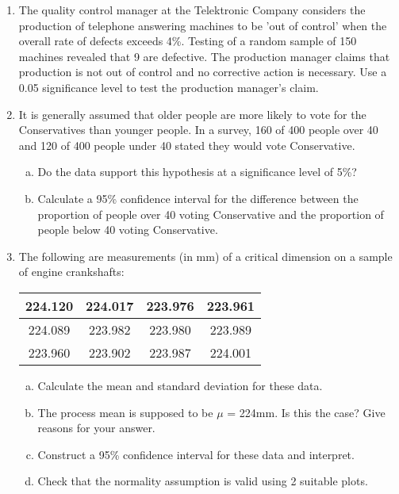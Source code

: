 \documentclass[a4paper,12pt]{article}
\begin{document}
\begin{enumerate}
\item  
The quality control manager at the Telektronic Company considers the production of telephone answering machines to be ’out of control’ when the overall rate of defects exceeds 4\%. 
Testing of a random sample of 150 machines revealed that 9 are defective. The production manager claims that production is not out of control and no corrective action is necessary. Use a 0.05 significance level to test the production manager’s claim.

\item 
It is generally assumed that older people are more likely to vote for the Conservatives than younger people. In a survey, 160 of 400 people over 40 and 120 of 400 people under 40 stated they would vote Conservative. 
\begin{enumerate}[(a)]
\item Do the data support this hypothesis at a significance level of 5\%?
\item Calculate a 95\% confidence interval for the difference between the proportion of people over 40 voting Conservative and the proportion of people below 40 voting Conservative. 
\end{enumerate}
\item The following are measurements (in mm) of a critical
dimension on a sample of engine crankshafts:
\begin{center}
\begin{tabular}{|c|c|c|c|} \hline
224.120 & 224.017 & 223.976 & 223.961 \\ \hline
224.089 & 223.982 & 223.980 & 223.989  \\ \hline
223.960 & 223.902  & 223.987 & 224.001  \\ \hline
\end{tabular}
\end{center}

\begin{enumerate}[(a)]
\item Calculate the mean and standard deviation for these data.
\item The process mean is supposed to be $\mu$ = 224mm. Is this the
case? Give reasons for your answer.\\
\item Construct a 95\% confidence interval for these data and
interpret.\\
\item Check that the normality assumption is valid using 2 suitable
plots.
\end{enumerate}



\end{enumerate}
\end{document}
